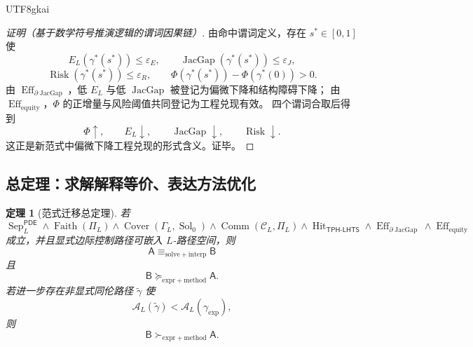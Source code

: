 \documentclass[12pt]{article}
\newtheorem{theorem}{定理}[section]
\newcommand{\TPHLHTS}{\ensuremath{\mathsf{TPH\mbox{-}LHTS}}}
\newcommand{\PDE}{\ensuremath{\mathsf{PDE}}}
\DeclareMathOperator{\Sol}{Sol}
\DeclareMathOperator{\Eff}{Eff}
\DeclareMathOperator{\Hit}{Hit}
\DeclareMathOperator{\JacGap}{JacGap}
\DeclareMathOperator{\Risk}{Risk}
\DeclareMathOperator{\Sep}{Sep}
\DeclareMathOperator{\Faith}{Faith}
\DeclareMathOperator{\Cover}{Cover}
\DeclareMathOperator{\Comm}{Comm}
\begin{document}
\begin{CJK*}{UTF8}{gkai}
\begin{proof}[证明（基于数学符号推演逻辑的谓词因果链）]
由命中谓词定义，存在 \(s^\ast\in[0,1]\) 使
\[
  E_L(\gamma^\ast(s^\ast))\le\varepsilon_E,
  \qquad
  \JacGap(\gamma^\ast(s^\ast))\le\varepsilon_J,
\]
\[
  \Risk(\gamma^\ast(s^\ast))\le\varepsilon_R,
  \qquad
  \Phi(\gamma^\ast(s^\ast))-\Phi(\gamma^\ast(0))>0.
\]
由 \(\Eff_{\partial\JacGap}\)，低 \(E_L\) 与低 \(\JacGap\) 被登记为偏微下降和结构障碍下降；
由 \(\Eff_{\mathrm{equity}}\)，\(\Phi\) 的正增量与风险阈值共同登记为工程兑现有效。
四个谓词合取后得到
\[
  \Phi\uparrow,
  \qquad
  E_L\downarrow,
  \qquad
  \JacGap\downarrow,
  \qquad
  \Risk\downarrow.
\]
这正是新范式中偏微下降工程兑现的形式含义。证毕。
\end{proof}

\subsection{总定理：求解解释等价、表达方法优化}
\label{subsec:tex58-paradigm-main-theorem}

\begin{theorem}[范式迁移总定理]
\label{thm:tex58-paradigm-migration-main}
若
\[
  \Sep_L^{\PDE}
  \wedge
  \Faith(\Pi_L)
  \wedge
  \Cover(\Gamma_L,\Sol_0)
  \wedge
  \Comm(\mathcal C_L,\Pi_L)
  \wedge
  \Hit_{\TPHLHTS}
  \wedge
  \Eff_{\partial\JacGap}
  \wedge
  \Eff_{\mathrm{equity}}
\]
成立，并且显式边际控制路径可嵌入 \(L\)-路径空间，则
\[
  \boxed{
  \mathsf A
  \equiv_{\mathrm{solve+interp}}
  \mathsf B
  }
\]
且
\[
  \boxed{
  \mathsf B
  \succcurlyeq_{\mathrm{expr+method}}
  \mathsf A.
  }
\]
若进一步存在非显式同伦路径 \(\widetilde\gamma\) 使
\[
  \mathcal A_L(\widetilde\gamma)
  <
  \mathcal A_L(\gamma_{\mathrm{exp}}),
\]
则
\[
  \boxed{
  \mathsf B
  \succ_{\mathrm{expr+method}}
  \mathsf A.
  }
\]
\end{theorem}


\end{CJK*}
\end{document}
